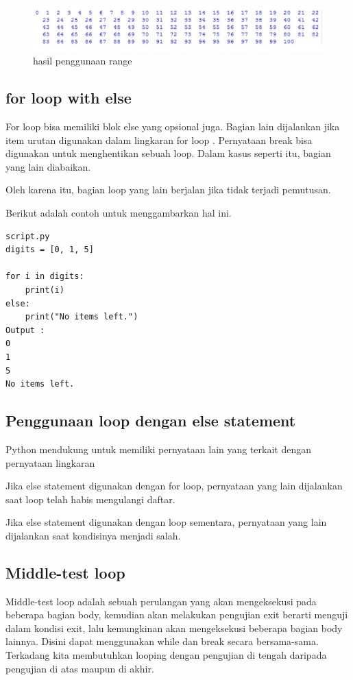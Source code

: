 \begin{figure}[ht]
    \centerline{\includegraphics[width=1\textwidth]{figures/2_range3.JPG}}
    \caption{hasil penggunaan range}
    \label{2_range3}
    \end{figure}

\subsection{for loop with else}
For loop bisa memiliki blok else yang opsional juga. Bagian lain dijalankan jika item urutan digunakan dalam lingkaran for loop .
Pernyataan break bisa digunakan untuk menghentikan sebuah loop. Dalam kasus seperti itu, bagian yang lain diabaikan.

Oleh karena itu, bagian loop yang lain berjalan jika tidak terjadi pemutusan.

Berikut adalah contoh untuk menggambarkan hal ini.
\begin{verbatim}
script.py 
digits = [0, 1, 5]

for i in digits:
    print(i)
else:
    print("No items left.")
Output :
0
1
5
No items left.
\end{verbatim}

\subsection{Penggunaan loop dengan else statement}
Python mendukung untuk memiliki pernyataan lain yang terkait dengan pernyataan lingkaran

Jika else statement digunakan dengan for loop, pernyataan yang lain dijalankan saat loop telah habis mengulangi daftar.

Jika else statement digunakan dengan loop sementara, pernyataan yang lain dijalankan saat kondisinya menjadi salah.

\subsection{Middle-test loop}
Middle-test loop adalah sebuah perulangan yang akan mengeksekusi pada beberapa bagian body, kemudian akan melakukan pengujian exit berarti menguji dalam kondisi exit, lalu kemungkinan akan mengeksekusi beberapa bagian body lainnya. Disini dapat menggunakan while dan break secara bersama-sama. Terkadang kita membutuhkan looping dengan pengujian di tengah daripada pengujian di atas maupun di akhir.

